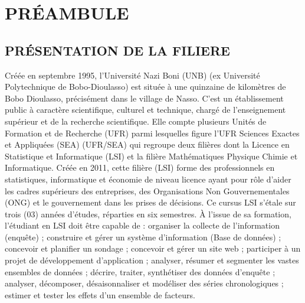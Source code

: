 \documentclass[
12pt,          %
a4paper,       %
oneside,      %
openright      %
]{report}          %
\begin{document}
		
		
		\chapter*{PR\'EAMBULE}
		\section*{PR\'ESENTATION DE LA FILIERE}
		Créée en septembre 1995, l'Université Nazi Boni (UNB) (ex Université Polytechnique de Bobo-Dioulasso) est située à une quinzaine de kilomètres de Bobo Dioulasso, précisément dans le village de Nasso. C'est un établissement public à caractère scientifique, culturel et technique, chargé de l'enseignement supérieur et de la recherche
		scientifique. Elle compte plusieurs Unités de Formation et de Recherche (UFR) parmi lesquelles figure l'UFR Sciences Exactes et Appliquées (SEA) (UFR/SEA) qui regroupe deux filières dont la Licence en Statistique et Informatique (LSI) et la filière Mathématiques Physique Chimie et Informatique. Créée en 2011, cette filière (LSI) forme des
		professionnels en statistiques, informatique et économie de niveau licence ayant pour rôle d'aider	les cadres supérieurs des entreprises, des Organisations Non Gouvernementales (ONG) et le gouvernement dans les prises de décisions.
		Ce cursus LSI s'étale sur trois (03) années d'études, réparties en six semestres. À l'issue de sa
		formation, l'étudiant en LSI doit être capable de :
		 organiser la collecte de l'information (enquête) ;
		 construire et gérer un système d'information (Base de données) ;
		 concevoir et planifier un sondage ;
		 concevoir et gérer un site web ;
		participer à un projet de développement d'application ;
		analyser, résumer et segmenter les vastes ensembles de données ;
		décrire, traiter, synthétiser des données d'enquête ;
		 analyser, décomposer, désaisonnaliser et modéliser des séries chronologiques ;
		 estimer et tester les effets d'un ensemble de facteurs.
	
		\cleardoublepage
		
\end{document}

